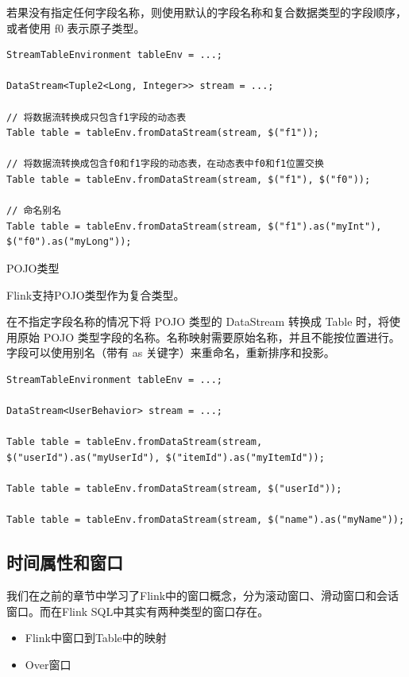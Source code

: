 \documentclass[cn,11pt,chinese]{elegantbook}
\begin{document}
若果没有指定任何字段名称，则使用默认的字段名称和复合数据类型的字段顺序，或者使用 f0 表示原子类型。

\begin{verbatim}
StreamTableEnvironment tableEnv = ...;

DataStream<Tuple2<Long, Integer>> stream = ...;

// 将数据流转换成只包含f1字段的动态表
Table table = tableEnv.fromDataStream(stream, $("f1"));

// 将数据流转换成包含f0和f1字段的动态表，在动态表中f0和f1位置交换
Table table = tableEnv.fromDataStream(stream, $("f1"), $("f0"));

// 命名别名
Table table = tableEnv.fromDataStream(stream, $("f1").as("myInt"), $("f0").as("myLong"));
\end{verbatim}

POJO类型

Flink支持POJO类型作为复合类型。

在不指定字段名称的情况下将 POJO 类型的 DataStream 转换成 Table 时，将使用原始 POJO 类型字段的名称。名称映射需要原始名称，并且不能按位置进行。字段可以使用别名（带有 as 关键字）来重命名，重新排序和投影。

\begin{verbatim}
StreamTableEnvironment tableEnv = ...;

DataStream<UserBehavior> stream = ...;

Table table = tableEnv.fromDataStream(stream, $("userId").as("myUserId"), $("itemId").as("myItemId"));

Table table = tableEnv.fromDataStream(stream, $("userId"));

Table table = tableEnv.fromDataStream(stream, $("name").as("myName"));
\end{verbatim}

\subsection{时间属性和窗口}

我们在之前的章节中学习了Flink中的窗口概念，分为滚动窗口、滑动窗口和会话窗口。而在Flink SQL中其实有两种类型的窗口存在。

\begin{itemize}
  \item Flink中窗口到Table中的映射
  \item Over窗口
\end{itemize}
\end{document}
